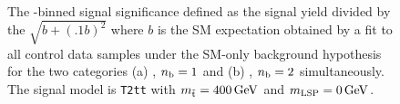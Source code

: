 \begin{figure}[t!]
  \begin{center}
     \\
    \caption{\label{fig:t2tt-sig-400} The \scalht-binned 
      signal significance defined as the signal yield 
      divided by the $\sqrt{b+(.1b)^2}$ where $b$ is the
      SM expectation obtained by a fit to all 
      control data samples under the SM-only background 
      hypothesis for the two categories (a) \njethigh, $n_{\text{b}} = 1$ and (b) 
      \njethigh, $n_{\text{b}} = 2$ simultaneously. 
      The signal model is \texttt{T2tt} with 
      $m_{\tilde{\rm t}} = 400\,\text{Ge\hspace{-.08em}V}$ and $m_{\text{LSP}} = 0\,\text{Ge\hspace{-.08em}V}$.} 
  \end{center}
\end{figure}

